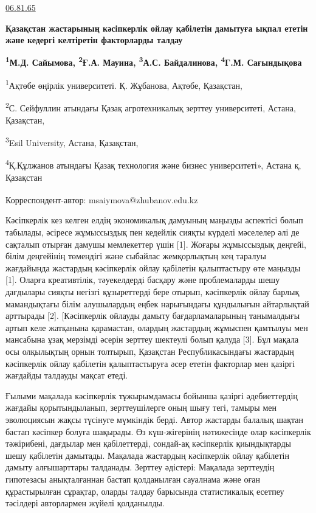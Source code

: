 

\href{https://grnti.ru/?p1=06&p2=81&p3=65\#65}{06.81.65}

{\bfseries Қазақстан жастарының кәсіпкерлік ойлау қабілетін дамытуға ықпал
ететін және кедергі келтіретін факторларды талдау}

{\bfseries \textsuperscript{1}М.Д. Сайымова\textsuperscript{\envelope },
\textsuperscript{2}Ғ.А. Мауина, \textsuperscript{3}А.С. Байдалинова,
\textsuperscript{4}Г.М. Сағындықова}

\textsuperscript{1}Ақтөбе өңірлік университеті. Қ. Жұбанова, Ақтөбе,
Қазақстан,

\textsuperscript{2}С. Сейфуллин атындағы Қазақ агротехникалық зерттеу
университеті, Астана, Қазақстан,

\textsuperscript{3}Esil University, Астана, Қазақстан,

\textsuperscript{4}Қ.Құлжанов атындағы Қазақ технология және бизнес
университеті», Астана қ, Қазақстан

{\bfseries \textsuperscript{\envelope }}Корреспондент-автор:
msaiymova@zhubanov.edu.kz

Кәсіпкерлік кез келген елдің экономикалық дамуының маңызды аспектісі
болып табылады, әсіресе жұмыссыздық пен кедейлік сияқты күрделі
мәселелер әлі де сақталып отырған дамушы мемлекеттер үшін {[}1{]}.
Жоғары жұмыссыздық деңгейі, білім деңгейінің төмендігі және сыбайлас
жемқорлықтың кең таралуы жағдайында жастардың кәсіпкерлік ойлау
қабілетін қалыптастыру өте маңызды {[}1{]}. Оларға креативтілік,
тәуекелдерді басқару және проблемаларды шешу дағдылары сияқты негізгі
құзыреттерді бере отырып, кәсіпкерлік ойлау барлық мамандықтағы білім
алушылардың еңбек нарығындағы құндылығын айтарлықтай арттырады {[}2{]}.
{[}Кәсіпкерлік ойлауды дамыту бағдарламаларының танымалдығы артып келе
жатқанына қарамастан, олардың жастардың жұмыспен қамтылуы мен мансабына
ұзақ мерзімді әсерін зерттеу шектеулі болып қалуда {[}3{]}. Бұл мақала
осы олқылықтың орнын толтырып, Қазақстан Республикасындағы жастардың
кәсіпкерлік ойлау қабілетін қалыптастыруға әсер ететін факторлар мен
қазіргі жағдайды талдауды мақсат етеді.

Ғылыми мақалада кәсіпкерлік тұжырымдамасы бойынша қазіргі әдебиеттердің
жағдайы қорытындыланып, зерттеушілерге оның шығу тегі, тамыры мен
эволюциясын жақсы түсінуге мүмкіндік берді. Автор жастарды балалық
шақтан бастап кәсіпкер болуға шақырады. Өз күш-жігерінің нәтижесінде
олар кәсіпкерлік тәжірибені, дағдылар мен қабілеттерді, сондай-ақ
кәсіпкерлік қиындықтарды шешу қабілетін дамытады. Мақалада жастардың
кәсіпкерлік ойлау қабілетін дамыту алғышарттары талданады. Зерттеу
әдістері: Мақалада зерттеудің гипотезасы анықталғаннан бастап
қолданылған сауалнама және оған құрастырылған сұрақтар, оларды талдау
барысында статистикалық есетпеу тәсілдері авторлармен жүйелі қолданылды.

